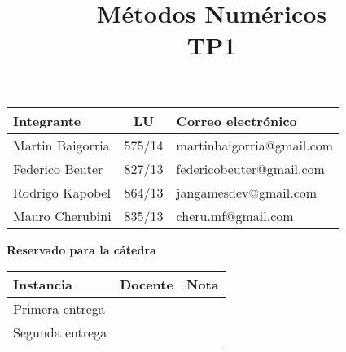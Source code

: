 \documentclass[10pt,a4paper]{article}
\title{Métodos Numéricos \\ TP1}
\begin{document}

\maketitle

\bigskip

\begin{table}[h]
\centering
\begin{tabular}{|l l l|}
\hline
Integrante       & \multicolumn{1}{c}{LU}     & Correo electrónico        \\ \hline
Martin Baigorria & \multicolumn{1}{c}{575/14} & martinbaigorria@gmail.com \\ 
Federico Beuter & 827/13                      & federicobeuter@gmail.com \\
Rodrigo Kapobel & 864/13                      & jangamesdev@gmail.com \\ 
Mauro Cherubini & 835/13                      & cheru.mf@gmail.com \\ \hline
\end{tabular}
\end{table}

\vfill

\begin{center}
\textbf{Reservado para la cátedra}
\end{center}
\begin{table}[h]
\centering
\begin{tabular}{|l|l|l|}
\hline
Instancia       & Docente & Nota \\ \hline
Primera entrega &         &      \\ \hline
Segunda entrega &         &      \\ \hline
\end{tabular}
\end{table}

\newpage
\tableofcontents
\newpage


%

\end{document}
